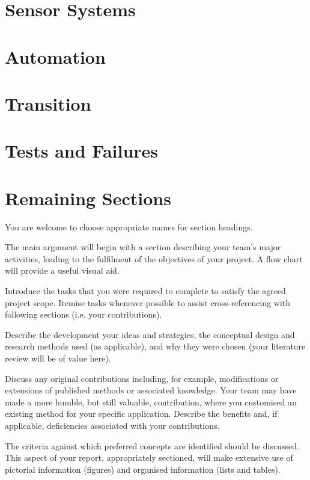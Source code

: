 \documentclass[]{article}
\begin{document}
\section{Sensor Systems}


\section{Automation}


\section{Transition}


\section{Tests and Failures}


\section{Remaining Sections}
\color{red}
You are welcome to choose appropriate names for section headings.

The main argument will begin with a section describing your team’s major activities, leading to the fulfilment of the objectives of your project.  A flow chart will provide a useful visual aid.

Introduce the tasks that you were required to complete to satisfy the agreed project scope.  Itemise tasks whenever possible to assist cross-referencing with following sections (i.e. your contributions).

Describe the development your ideas and strategies, the conceptual design and research methods used (as applicable), and why they were chosen (your literature review will be of value here).  

Discuss any original contributions including, for example, modifications or extensions of published methods or associated knowledge.  Your team may have made a more humble, but still valuable, contribution, where you customised an existing method for your specific application.  Describe the benefits and, if applicable, deficiencies associated with your contributions.

The criteria against which preferred concepts are identified should be discussed.  This aspect of your report, appropriately sectioned, will make extensive use of pictorial information (figures) and organised information (lists and tables).  
\end{document}
